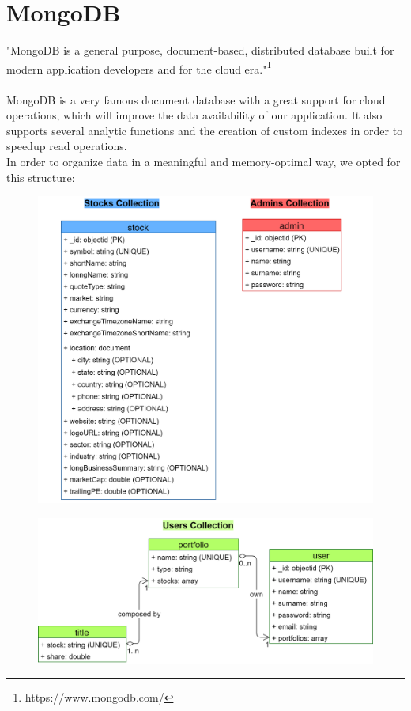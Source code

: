 \section{MongoDB}
"MongoDB is a general purpose, document-based, distributed database built for
modern application developers and for the cloud era."\footnote{https://www.mongodb.com/}\\\\
MongoDB is a very famous document database with a great support for cloud
operations, which will improve the data availability of our application. It also
supports several analytic functions and the creation of custom indexes in order
to speedup read operations.\\
In order to organize data in a meaningful and memory-optimal way, we opted for
this structure:
\begin{figure}[H]
    \vspace{0.2cm}
	\begin{center}
		\includegraphics[scale=0.74]{img/mongoDB_schema_1.png}
	\end{center}
\end{figure}
\begin{figure}[H]
	\begin{center}
		\includegraphics[scale=0.2]{img/mongoDB_schema_2.png}
	\end{center}
\end{figure}

